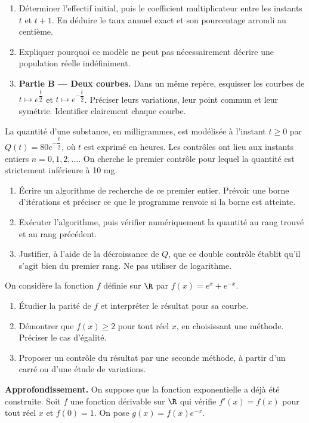 \begin{enumerate}[label=\arabic*.]
\item Déterminer l’effectif initial, puis le coefficient multiplicateur entre les instants $t$ et $t+1$. En déduire le taux annuel exact et son pourcentage arrondi au centième.
\item Expliquer pourquoi ce modèle ne peut pas nécessairement décrire une population réelle indéfiniment.
\item \textbf{Partie B — Deux courbes.} Dans un même repère, esquisser les courbes de $t\mapsto e^{\dfrac{t}{2}}$ et $t\mapsto e^{-\dfrac{t}{2}}$. Préciser leurs variations, leur point commun et leur symétrie. Identifier clairement chaque courbe.
\end{enumerate}
La quantité d’une substance, en milligrammes, est modélisée à l’instant $t\geq0$ par $Q(t)=80e^{-\dfrac{t}{2}}$, où $t$ est exprimé en heures. Les contrôles ont lieu aux instants entiers $n=0,1,2,\ldots$. On cherche le premier contrôle pour lequel la quantité est strictement inférieure à 10 mg.
\begin{enumerate}[label=\arabic*.]
\item Écrire un algorithme de recherche de ce premier entier. Prévoir une borne d’itérations et préciser ce que le programme renvoie si la borne est atteinte.
\item Exécuter l’algorithme, puis vérifier numériquement la quantité au rang trouvé et au rang précédent.
\item Justifier, à l’aide de la décroissance de $Q$, que ce double contrôle établit qu’il s’agit bien du premier rang. Ne pas utiliser de logarithme.
\end{enumerate}
On considère la fonction $f$ définie sur $\R$ par $f(x)=e^x+e^{-x}$.
\begin{enumerate}[label=\arabic*.]
\item Étudier la parité de $f$ et interpréter le résultat pour sa courbe.
\item Démontrer que $f(x)\geq2$ pour tout réel $x$, en choisissant une méthode. Préciser le cas d’égalité.
\item Proposer un contrôle du résultat par une seconde méthode, à partir d’un carré ou d’une étude de variations.
\end{enumerate}
\textbf{Approfondissement.} On suppose que la fonction exponentielle a déjà été construite. Soit $f$ une fonction dérivable sur $\R$ qui vérifie $f\prime(x)=f(x)$ pour tout réel $x$ et $f(0)=1$. On pose $g(x)=f(x)e^{-x}$.
